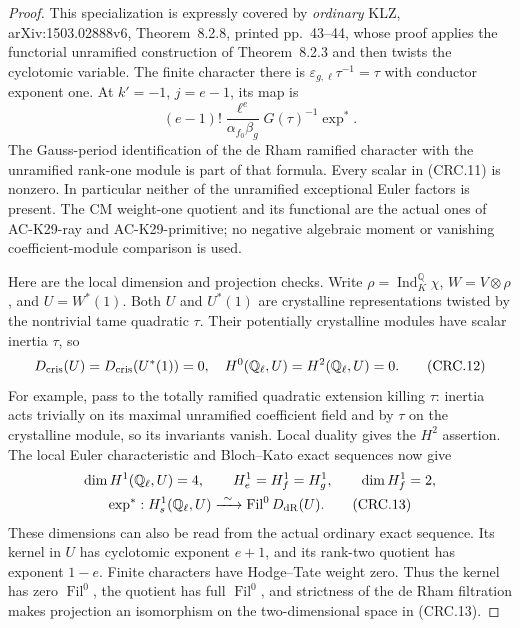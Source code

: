 \begin{proof}
This specialization is expressly covered by
\emph{ordinary} KLZ, arXiv:1503.02888v6,
Theorem~8.2.8, printed pp.~43--44, whose proof
applies the functorial unramified construction of
Theorem~8.2.3 and then twists the cyclotomic variable.
The finite character there is
$\varepsilon_{g,\ell}\tau^{-1}=\tau$ with conductor
exponent one.  At $k'=-1$, $j=e-1$, its map is
\[
   (e-1)!\frac{\ell^e}{\alpha_{f_0}\beta_g}
             G(\tau)^{-1}\exp^*.                         \tag{CRC.11}
\]
The Gauss-period identification of the de Rham
ramified character with the unramified rank-one
module is part of that formula.  Every scalar in
(CRC.11) is nonzero.  In particular neither of the
unramified exceptional Euler factors is present.
The CM weight-one quotient and its functional are
the actual ones of AC-K29-ray and
AC-K29-primitive; no negative algebraic moment or
vanishing coefficient-module comparison is used.

Here are the local dimension and projection checks.
Write $\rho=\operatorname{Ind}_K^{\mathbb Q}\chi$,
$W=V\otimes\rho$, and $U=W^*(1)$.  Both $U$ and
$U^*(1)$ are crystalline representations twisted
by the nontrivial tame quadratic $\tau$.
Their potentially crystalline modules have scalar
inertia $\tau$, so
\[
 D_{\rm cris}(U)=D_{\rm cris}(U^*(1))=0,
 \quad H^0(\mathbb Q_\ell,U)=H^2(\mathbb Q_\ell,U)=0.
                                                        \tag{CRC.12}
\]
For example, pass to the totally ramified quadratic
extension killing $\tau$: inertia acts trivially on
its maximal unramified coefficient field and by
$\tau$ on the crystalline module, so its invariants
vanish.  Local duality gives the $H^2$ assertion.
The local Euler characteristic and Bloch--Kato
exact sequences now give
\[
 \begin{gathered}
 \dim H^1(\mathbb Q_\ell,U)=4,\qquad
 H^1_e=H^1_f=H^1_g,\qquad \dim H^1_f=2,
 \\
 \exp^*:H^1_s(\mathbb Q_\ell,U)
          \xrightarrow{\ \sim\ }\operatorname{Fil}^0D_{\rm dR}(U).
                                                        \tag{CRC.13}
 \end{gathered}
\]
These dimensions can also be read from the actual
ordinary exact sequence.  Its kernel in $U$ has
cyclotomic exponent $e+1$, and its rank-two quotient
has exponent $1-e$.  Finite characters have Hodge--Tate
weight zero.  Thus the kernel has zero
$\operatorname{Fil}^0$, the quotient has full
$\operatorname{Fil}^0$, and strictness of the de Rham
filtration makes projection an isomorphism on the
two-dimensional space in (CRC.13).


\end{proof}
